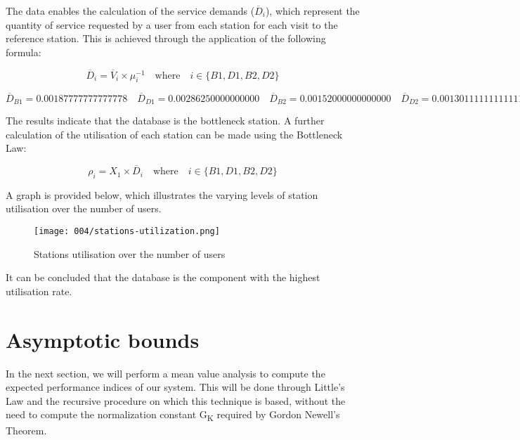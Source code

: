 The data enables the calculation of the service demands ($\overline{D}_i$), which represent the quantity of service requested by a user from each station for each visit to the reference station.
This is achieved through the application of the following formula:

\label{eq:service-demands}
\begin{equation}
	\overline{D}_i = \overline{V}_i \times \mu^{-1}_i \quad \text{where} \quad i \in \{B1, D1, B2, D2\}
\end{equation}

\[
\overline{D}_{B1} = \num[round-mode=places, round-precision=5]{0.00187777777777778}
\quad
\overline{D}_{D1} = \num[round-mode=places, round-precision=5]{0.00286250000000000}
\quad
\overline{D}_{B2} = \num[round-mode=places, round-precision=5]{0.00152000000000000}
\quad
\overline{D}_{D2} = \num[round-mode=places, round-precision=5]{0.00130111111111111}
\]

The results indicate that the database is the bottleneck station. 
A further calculation of the utilisation of each station can be made using the Bottleneck Law:

\label{eq:bottleneck-law}
\begin{equation}
	\rho_i = X_1 \times \overline{D}_i \quad \text{where} \quad i \in \{B1, D1, B2, D2\}
\end{equation}

A graph is provided below, which illustrates the varying levels of station utilisation over the number of users.

\begin{figure}[h]
	\centering
	\texttt{[image: 004/stations-utilization.png]}
	\caption{Stations utilisation over the number of users}
\end{figure}

It can be concluded that the database is the component with the highest utilisation rate.

\section{Asymptotic bounds}

In the next section, we will perform a mean value analysis to compute the expected performance indices of our system.
This will be done through Little's Law and the recursive procedure on which this technique is based, without the need to compute the normalization constant G\textsubscript{K} required by Gordon Newell's Theorem.

